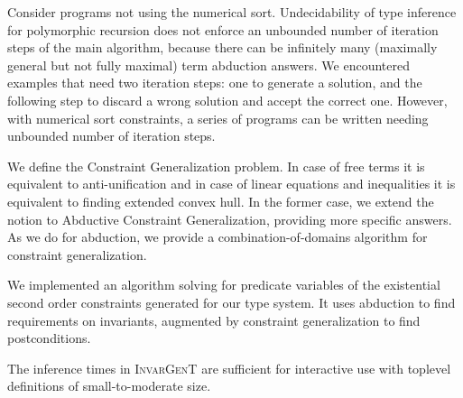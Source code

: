\documentclass{article}
\newcommand{\tmname}[1]{\textsc{#1}}
\begin{document}
Consider programs not using the numerical sort. Undecidability of type
inference for polymorphic recursion does not enforce an unbounded number of
iteration steps of the main algorithm, because there can be infinitely many
(maximally general but not fully maximal) term abduction answers. We
encountered examples that need two iteration steps: one to generate a
solution, and the following step to discard a wrong solution and accept the
correct one. However, with numerical sort constraints, a series of programs
can be written needing unbounded number of iteration steps.

We define the Constraint Generalization problem. In case of free terms it is
equivalent to anti-unification and in case of linear equations and
inequalities it is equivalent to finding extended convex hull. In the former
case, we extend the notion to Abductive Constraint Generalization, providing
more specific answers. As we do for abduction, we provide a
combination-of-domains algorithm for constraint generalization.

We implemented an algorithm solving for predicate variables of the existential
second order constraints generated for our type system. It uses abduction to
find requirements on invariants, augmented by constraint generalization to
find postconditions.

The inference times in {\tmname{InvarGenT}} are sufficient for interactive use
with toplevel definitions of small-to-moderate size.
\end{document}
